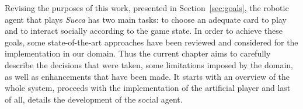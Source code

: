 \label{chapter:approach}

Revising the purposes of this work, presented in Section~\ref{sec:goals}, the robotic agent that plays \emph{Sueca} has two main tasks: to choose an adequate card to play and to interact socially according to the game state.
In order to achieve these goals, some state-of-the-art approaches have been reviewed and considered for the implementation in our domain.
Thus the current chapter aims to carefully describe the decisions that were taken, some limitations imposed by the domain, as well as enhancements that have been made.
It starts with an overview of the whole system, proceeds with the implementation of the artificial player and last of all, details the development of the social agent.





\clearpage

